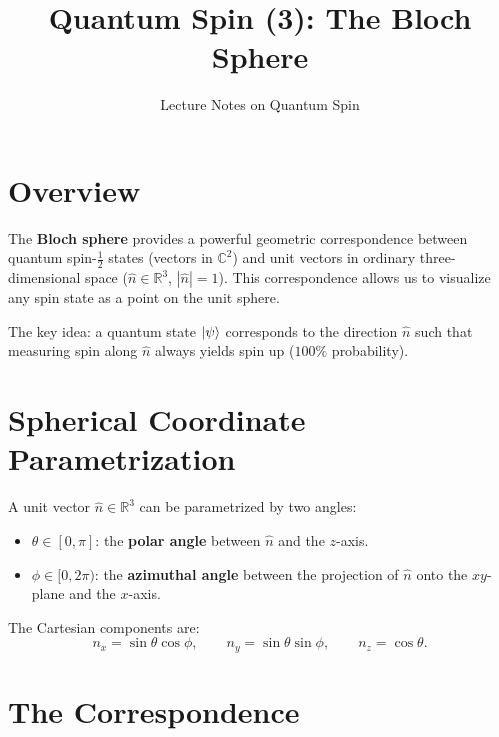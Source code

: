 \documentclass[11pt,a4paper]{article}
\title{\textbf{Quantum Spin (3): The Bloch Sphere}}
\author{Lecture Notes on Quantum Spin}
\date{}
\theoremstyle{definition}
\theoremstyle{plain}
\theoremstyle{remark}
\begin{document}
\maketitle
\tableofcontents
\newpage

\section{Overview}

The \textbf{Bloch sphere} provides a powerful geometric correspondence between quantum spin-$\frac{1}{2}$ states (vectors in $\mathbb{C}^2$) and unit vectors in ordinary three-dimensional space ($\hat{n} \in \mathbb{R}^3$, $|\hat{n}|=1$). This correspondence allows us to visualize any spin state as a point on the unit sphere.

The key idea: a quantum state $\ket{\psi}$ corresponds to the direction $\hat{n}$ such that measuring spin along $\hat{n}$ always yields spin up ($100\%$ probability).

\section{Spherical Coordinate Parametrization}

A unit vector $\hat{n} \in \mathbb{R}^3$ can be parametrized by two angles:
\begin{itemize}
    \item $\theta \in [0, \pi]$: the \textbf{polar angle} between $\hat{n}$ and the $z$-axis.
    \item $\phi \in [0, 2\pi)$: the \textbf{azimuthal angle} between the projection of $\hat{n}$ onto the $xy$-plane and the $x$-axis.
\end{itemize}

The Cartesian components are:
\[
    \boxed{n_x = \sin\theta\cos\phi, \qquad n_y = \sin\theta\sin\phi, \qquad n_z = \cos\theta.}
\]

\section{The Correspondence}
\end{document}
